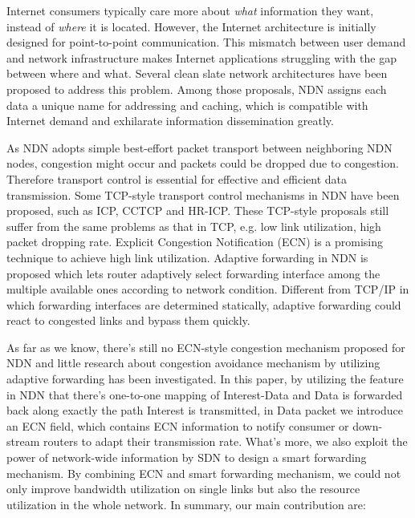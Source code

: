 
Internet consumers typically care more about \emph{what} information they want, instead of \emph{where} it is located. However, the Internet architecture is initially designed for point-to-point communication. This mismatch between user demand and network infrastructure makes Internet applications struggling with the gap between where and what. Several clean slate network architectures have been proposed to address this problem. Among those proposals, NDN\cite{NDN} assigns each data a unique name for addressing and caching, which is compatible with Internet demand and exhilarate information dissemination greatly. 

As NDN adopts simple best-effort packet transport between neighboring NDN nodes, congestion might occur and packets could be dropped due to congestion. Therefore transport control is essential for effective and efficient data transmission. Some TCP-style transport control mechanisms in NDN have been proposed, such as ICP\cite{ICP}, CCTCP\cite{CCTCP} and HR-ICP\cite{shape}. These TCP-style proposals still suffer from the same problems as that in TCP, e.g. low link utilization, high packet dropping rate. Explicit Congestion Notification (ECN) is a promising technique to achieve high link utilization\cite{XCP}. Adaptive forwarding\cite{Adaptive} in NDN is proposed which lets router adaptively select forwarding interface among the multiple available ones according to network condition. Different from TCP/IP in which forwarding interfaces are determined statically, adaptive forwarding could react to congested links and bypass them quickly.

As far as we know, there's still no ECN-style congestion mechanism proposed for NDN and little research about congestion avoidance mechanism by utilizing adaptive forwarding has been investigated. In this paper, by utilizing the feature in NDN that there's one-to-one mapping of Interest-Data and Data is forwarded back along exactly the path Interest is transmitted, in Data packet we introduce an ECN field, which contains ECN information to notify consumer or down-stream routers to adapt their transmission rate. What's more, we also exploit the power of network-wide information by SDN\cite{SDN} to design a smart forwarding mechanism. By combining ECN and smart forwarding mechanism, we could not only improve bandwidth utilization on single links but also the resource utilization in the whole network. In summary, our main contribution are:


